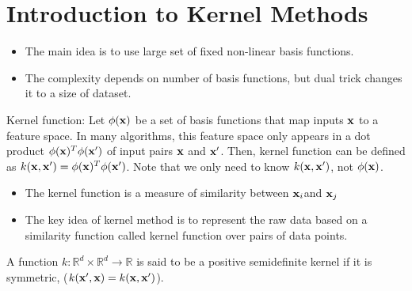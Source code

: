 \chapter{Introduction to Kernel Methods}
\begin{itemize}
	\item The main idea is to use large set of fixed non-linear basis functions.
	\item The complexity depends on number of basis functions, but dual trick changes it to a size of dataset. 
\end{itemize}

Kernel function: Let $\phi({\mathbf{x}})$ be a set of basis functions that map inputs ${\mathbf{x}}$ to a feature space. In many algorithms, this feature space only appears in a dot product $\phi({\mathbf{x}})^T\phi({\mathbf{x}}')$ of input pairs ${\mathbf{x}}$ and ${\mathbf{x}}'$. Then, kernel function can be defined as $k({\mathbf{x}}, {\mathbf{x}}') = \phi({\mathbf{x}})^T\phi({\mathbf{x}}')$. Note that we only need to know $k({\mathbf{x}}, {\mathbf{x}}')$, not $\phi({\mathbf{x}})$.
\begin{itemize}
	\item The kernel function is a measure of similarity between ${\mathbf{x}}_i$and ${\mathbf{x}}_j$ 
	\item The key idea of kernel method is to represent the raw data based on a similarity function called kernel function over pairs of data points. 
\end{itemize}

A function $k: \mathbb{R}^d\times \mathbb{R}^d\to \mathbb{R}$ is said to be a positive semidefinite kernel if it is symmetric, (\ie $k({\mathbf{x}}',{\mathbf{x}})= k({\mathbf{x}},{\mathbf{x}}')$).

